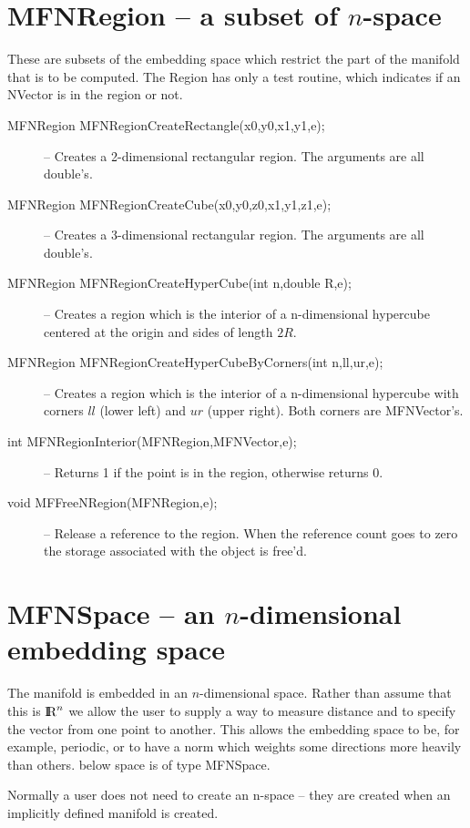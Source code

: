 \documentclass[12pt]{article}
\def\R{\hbox{\rm I\kern-.2150em R}}
\begin{document}
\section{ MFNRegion -- a subset of $n$-space}

   These are subsets of the embedding space which restrict the part of the manifold that is to be computed.
   The Region has only a test routine, which indicates if an NVector is in the region or not.

\begin{description}
\item [MFNRegion MFNRegionCreateRectangle(x0,y0,x1,y1,e);]
-- Creates a 2-dimensional rectangular region. The arguments are all {double}'s.
\item [MFNRegion MFNRegionCreateCube(x0,y0,z0,x1,y1,z1,e);]
-- Creates a 3-dimensional rectangular region. The arguments are all {double}'s.
\item [MFNRegion MFNRegionCreateHyperCube(int n,double R,e);]
-- Creates a region which is the interior of a n-dimensional hypercube centered
   at the origin and sides of length $2R$.
\item [MFNRegion MFNRegionCreateHyperCubeByCorners(int n,ll,ur,e);]
-- Creates a region which is the interior of a n-dimensional hypercube with
   corners ${ll}$ (lower left) and ${ur}$ (upper right). Both corners
   are {MFNVector}'s.
\item [int MFNRegionInterior(MFNRegion,MFNVector,e);]
-- Returns 1 if the point is in the region, otherwise returns 0.
\item [void MFFreeNRegion(MFNRegion,e);]
-- Release a reference to the region. When the reference count goes to zero the
   storage associated with the object is free'd.
\end{description}

\section{MFNSpace -- an $n$-dimensional embedding space}
    The manifold is embedded in an $n$-dimensional space. Rather than assume
    that this is $\R^n$ we allow the user to supply a way to measure distance
    and to specify the vector from one point to another. This allows the
    embedding space to be, for example, periodic, or to have a norm which
    weights some directions more heavily than others. below {space} is of type {MFNSpace}.

    Normally a user does not need to create an n-space -- they are created 
    when an implicitly defined manifold is created.
\end{document}
